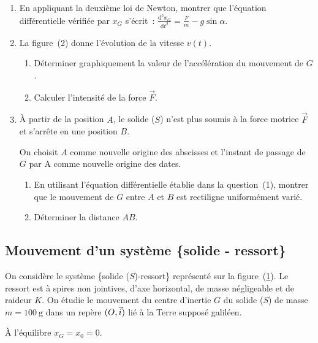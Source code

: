 \begin{enumerate}
    \item En appliquant la deuxième loi de Newton, montrer que l'équation
          différentielle vérifiée par $x_{G}$ s'écrit~:
          $\frac{\mathrm{d}^{2}x_{G}}{\mathrm{d}t^{2}}=\frac{F}{m}-g\sin\alpha$.
    \item La figure~(2) donne l'évolution de la vitesse $v(t)$.
          \begin{enumerate}
              \item Déterminer graphiquement la valeur de l'accélération du
                    mouvement de $G$.
              \item Calculer l'intensité de la force $\vec{F}$.
          \end{enumerate}
    \item À partir de la position $A$, le solide ($S$) n'est plus soumis à la
          force motrice $\vec{F}$ et s'arrête en une position $B$.

          On choisit $A$ comme nouvelle origine des abscisses et l'instant de
          passage de $G$ par A comme nouvelle origine des dates.
          \begin{enumerate}
              \item En utilisant l'équation différentielle établie dans la
                    question~(1), montrer que le mouvement de $G$ entre $A$ et
                    $B$ est rectiligne uniformément varié.
              \item Déterminer la distance $AB$.
          \end{enumerate}
\end{enumerate}

\subsection{Mouvement d'un système \{solide - ressort\}}
\begin{minipage}{0.65\linewidth}
    On considère le système \{solide ($S$)-ressort\} représenté sur la
    figure~(\ref{fig:solide_ressort}). Le ressort est à spires non jointives,
    d'axe horizontal, de masse négligeable et de raideur $K$. On étudie le
    mouvement du centre d'inertie $G$ du solide ($S$) de masse
    $m=\qty{100}{\gram}$ dans un repère $(O,\vec{i})$ lié à la Terre supposé
    galiléen.
    
    À l'équilibre $x_{G}=x_{0}=0$.
\end{minipage}
\hfill
\begin{minipage}{0.30\linewidth}
    \begin{figure}[H]
        \centering
        
        \caption{}
        \label{fig:solide_ressort}
    \end{figure}
\end{minipage}

